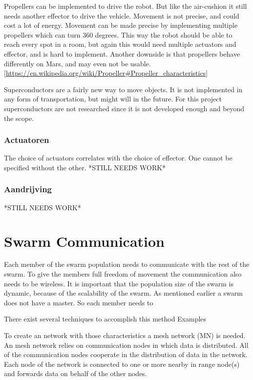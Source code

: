 \documentclass[10pt,a4paper]{article}
\begin{document}
Propellers can be implemented to drive the robot. But like the air-cushion it still needs another effector to drive the vehicle. Movement is not precise, and could cost a lot of energy. Movement can be made precise by implementing multiple propellers which can turn 360 degrees. This way the robot should be able to reach every spot in a room, but again this would need multiple actuators and effector, and is hard to implement. Another downside is that propellers behave differently on Mars, and may even not be usable. \ref{https://en.wikipedia.org/wiki/Propeller#Propeller_characteristics} 

Superconductors are a fairly new way to move objects. It is not implemented in any form of transportation, but might will in the future. For this project superconductors are not researched since it is not developed enough and beyond the scope. 


\subsubsection{Actuatoren}

The choice of actuators correlates with the choice of effector. One cannot be specified without the other. 
*STILL NEEDS WORK* 


\subsubsection{Aandrijving}
*STILL NEEDS WORK* 
\section{Swarm Communication}
Each member of the swarm population needs to communicate with the rest of the swarm. To give the members full freedom of movement the communication also needs to be wireless. It is important that the population size of the swarm is dynamic, because of the scalability of the swarm. As mentioned earlier a swarm does not have a master. So each member needs to


There exist several techniques to accomplish this method 
Examples

To create an network with those characteristics a mesh network (MN) is needed. An mesh network relies on communication nodes in which data is distributed. All of the communication nodes cooperate in the distribution of data in the network. Each node of the network is connected to one or more nearby in range node(s) and forwards data on behalf of the other nodes. 
\end{document}
